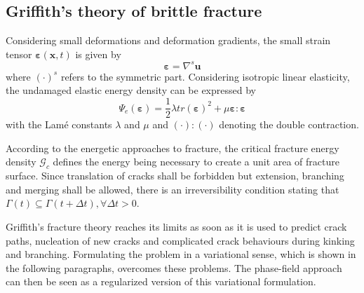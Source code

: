 \subsection{Griffith's theory of brittle fracture} \label{sec:formul_Griffith}
Considering small deformations and deformation gradients, the small strain tensor $\bm{\varepsilon}\left(\mathbf{x},t\right)$ is given by
\begin{equation}
	\bm{\varepsilon} = \nabla^{s}\mathbf{u}
\end{equation}
where $\left(\cdot\right)^{s}$ refers to the symmetric part. Considering isotropic linear elasticity, the undamaged elastic energy density can be expressed by
\begin{equation} \label{eq:psi_e}
	\Psi_ {e}\left(\bm{\varepsilon}\right) = \dfrac{1}{2}\lambda tr\left(\bm{\varepsilon}\right)^{2}+\mu\bm{\varepsilon}:\bm{\varepsilon}
\end{equation}
with the Lam\'{e} constants $\lambda$ and $\mu$ and $\left(\cdot\right):\left(\cdot\right)$ denoting the double contraction.

According to the energetic approaches to fracture, the critical fracture energy density $\mathcal{G}_{c}$ defines the energy being necessary to create a unit area of fracture surface. Since translation of cracks shall be forbidden but extension, branching and merging shall be allowed, there is an irreversibility condition stating that $\Gamma\left(t\right)\subseteq\Gamma\left(t+\Delta t\right), \forall \Delta t>0$.

Griffith's fracture theory reaches its limits as soon as it is used to predict crack paths, nucleation of new cracks and complicated crack behaviours during kinking and branching. Formulating the problem in a variational sense, which is shown in the following paragraphs, overcomes these problems. The phase-field approach can then be seen as a regularized version of this variational formulation. \citep{05_PF_ductile}

